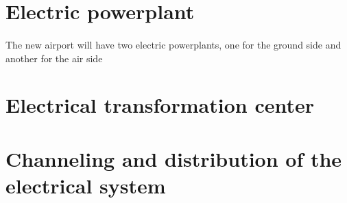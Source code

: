	\section{Electric powerplant}
	\paragraph{} The new airport will have two electric powerplants, one for the ground side and another for the air side
	
	
	\section{Electrical transformation center}
	
	\section{Channeling and distribution of the electrical system}
	